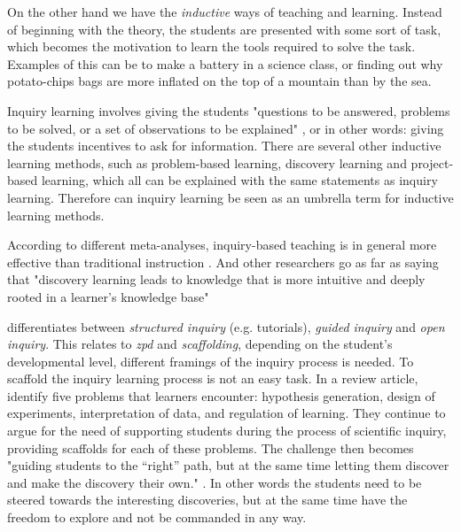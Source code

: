 On the other hand we have the \textit{inductive} ways of teaching and learning. Instead of beginning with the theory, the students are presented with some sort of task, which becomes the motivation to learn the tools required to solve the task. Examples of this can be to make a battery in a science class, or finding out why potato-chips bags are more inflated on the top of a mountain than by the sea.


Inquiry learning involves giving the students "questions to be answered, problems to be solved, or a set of observations to be explained" \citep{prince2006inductive}, or in other words: giving the students incentives to ask for information. There are several other inductive learning methods, such as problem-based learning, discovery learning and project-based learning, which all can be explained with the same statements as inquiry learning. Therefore can inquiry learning be seen as an umbrella term for inductive learning methods. \citep{prince2006inductive}

According to different meta-analyses, inquiry-based teaching is in general more effective than traditional instruction \citetext{\citealp{smith1996meta}; \citealp{haury1993teaching}, referenced in \citealp{prince2006inductive}}. And other researchers go as far as saying that "discovery learning leads to knowledge that is more intuitive and deeply rooted in a learner's knowledge base" \citetext{\citealp{berry1984relationship}; \citealp{laurillard1992learning}; \citealp{lindstrom1993computer}; \citealp{de1996measuring}, referenced in \citealp{de1998scientific}}

\citeauthor*{staver1987analysis} \citetext{\citeyear{staver1987analysis}, referenced in \citealp{prince2006inductive}} differentiates between \emph{structured inquiry} (e.g. tutorials), \emph{guided inquiry} and \emph{open inquiry}. This relates to \emph{zpd} and \emph{scaffolding}, depending on the student's developmental level, different framings of the inquiry process is needed. To scaffold the inquiry learning process is not an easy task. In a review article, \citet{de1998scientific} identify five problems that learners encounter: hypothesis generation, design of experiments, interpretation of data, and regulation of learning. They continue to argue for the need of supporting students during the process of scientific inquiry, providing scaffolds for each of these problems. The challenge then becomes "guiding students to the “right” path, but at the
same time letting them discover and make the discovery their own." \citep[p. 247]{kluge2010simulation}. In other words the students need to be steered towards the interesting discoveries, but at the same time have the freedom to explore and not be commanded in any way.


